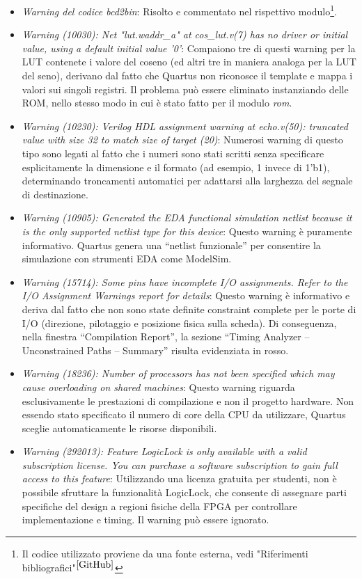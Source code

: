 \documentclass[reprint,amsmath,amssymb,aps,rmp,twoside]{revtex4-2}
\begin{document}
\begin{itemize}

\item \textit{Warning del codice bcd2bin}: Risolto e commentato nel rispettivo modulo\footnote{Il codice utilizzato proviene da una fonte esterna, vedi "Riferimenti bibliografici"$^{\cite{GitHub}}$}.
\item \textit{Warning (10030): Net "lut.waddr\_a" at cos\_lut.v(7) has no driver or initial value, using a default initial value '0'}:
Compaiono tre di questi warning per la LUT contenete i valore del coseno (ed altri tre in maniera analoga per la LUT del seno), derivano dal fatto che Quartus non riconosce il template e mappa i valori sui singoli registri. Il problema può essere eliminato instanziando delle ROM, nello stesso modo in cui è stato fatto per il modulo \textit{rom}.
\item \textit{Warning (10230): Verilog HDL assignment warning at echo.v(50): truncated value with size 32 to match size of target (20)}:
Numerosi warning di questo tipo sono legati al fatto che i numeri sono stati scritti senza specificare esplicitamente la dimensione e il formato (ad esempio, 1 invece di 1'b1), determinando troncamenti automatici per adattarsi alla larghezza del segnale di destinazione.
\item \textit{Warning (10905): Generated the EDA functional simulation netlist because it is the only supported netlist type for this device}:
Questo warning è puramente informativo. Quartus genera una “netlist funzionale” per consentire la simulazione con strumenti EDA come ModelSim.
\item \textit{Warning (15714): Some pins have incomplete I/O assignments. Refer to the I/O Assignment Warnings report for details}:
Questo warning è informativo e deriva dal fatto che non sono state definite constraint complete per le porte di I/O (direzione, pilotaggio e posizione fisica sulla scheda). Di conseguenza, nella finestra “Compilation Report”, la sezione “Timing Analyzer – Unconstrained Paths – Summary” risulta evidenziata in rosso.
\item \textit{Warning (18236): Number of processors has not been specified which may cause overloading on shared machines}:  
Questo warning riguarda esclusivamente le prestazioni di compilazione e non il progetto hardware. Non essendo stato specificato il numero di core della CPU da utilizzare, Quartus sceglie automaticamente le risorse disponibili.
\item \textit{Warning (292013): Feature LogicLock is only available with a valid subscription license. You can purchase a software subscription to gain full access to this feature}:
Utilizzando una licenza gratuita per studenti, non è possibile sfruttare la funzionalità LogicLock, che consente di assegnare parti specifiche del design a regioni fisiche della FPGA per controllare implementazione e timing. Il warning può essere ignorato.

\end{itemize}
\end{document}
